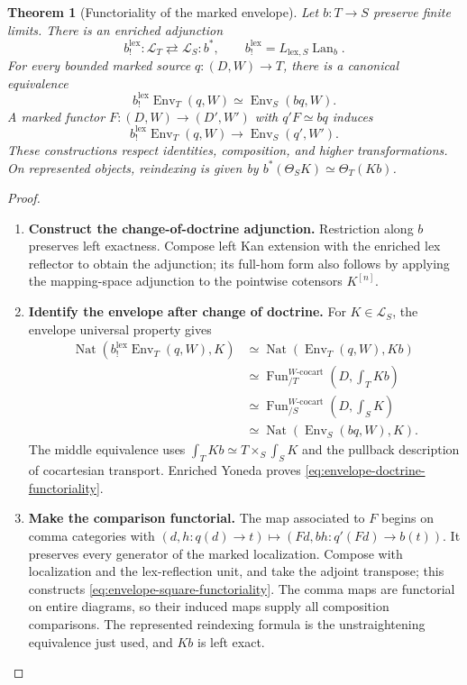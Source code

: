 \documentclass[oneside]{article}
\theoremstyle{plain}
\newtheorem{theorem}{Theorem}[section]
\theoremstyle{definition}
\theoremstyle{remark}
\newcommand{\Env}{\operatorname{Env}}
\newcommand{\Fun}{\operatorname{Fun}}
\newcommand{\Nat}{\operatorname{Nat}}
\newcommand{\coc}{\mathrm{cocart}}
\begin{document}
\begin{theorem}[Functoriality of the marked envelope]
\label{thz:thm:envelope-functoriality}
Let $b:T\to S$ preserve finite limits. There is an enriched adjunction
\[
 b_!^{\mathrm{lex}}:\mathcal L_T\rightleftarrows\mathcal L_S:b^*,
 \qquad b_!^{\mathrm{lex}}=L_{\mathrm{lex},S}\operatorname{Lan}_b.
\]
For every bounded marked source $q:(D,W)\to T$, there is a canonical
equivalence
\begin{equation}\label{eq:envelope-doctrine-functoriality}
 b_!^{\mathrm{lex}}\Env_T(q,W)\simeq\Env_S(bq,W).
\end{equation}
A marked functor $F:(D,W)\to(D',W')$ with $q'F\simeq bq$ induces
\begin{equation}\label{eq:envelope-square-functoriality}
 b_!^{\mathrm{lex}}\Env_T(q,W)\longrightarrow\Env_S(q',W').
\end{equation}
These constructions respect identities, composition, and higher
transformations. On represented objects, reindexing is given by
$b^*(\Theta_SK)\simeq\Theta_T(Kb)$.
\end{theorem}
\begin{proof}
\leavevmode
\begin{enumerate}
\item \textbf{Construct the change-of-doctrine adjunction.}
Restriction along $b$ preserves left exactness. Compose left Kan
extension with the enriched lex reflector to obtain the adjunction;
its full-hom form also follows by applying the mapping-space adjunction
to the pointwise cotensors $K^{[n]}$.

\item \textbf{Identify the envelope after change of doctrine.}
For $K\in\mathcal L_S$, the envelope universal property gives
\begin{align*}
 \Nat(b_!^{\mathrm{lex}}\Env_T(q,W),K)
 &\simeq\Nat(\Env_T(q,W),Kb)\\
 &\simeq\Fun^{W\text{-}\coc}_{/T}(D,\textstyle\int_TKb)\\
 &\simeq\Fun^{W\text{-}\coc}_{/S}(D,\textstyle\int_SK)\\
 &\simeq\Nat(\Env_S(bq,W),K).
\end{align*}
The middle equivalence uses
$\int_TKb\simeq T\times_S\int_SK$ and the pullback description of
cocartesian transport. Enriched Yoneda proves
\eqref{eq:envelope-doctrine-functoriality}.


\item \textbf{Make the comparison functorial.}
The map associated to $F$ begins on comma categories with
$(d,h:q(d)\to t)\mapsto(Fd,bh:q'(Fd)\to b(t))$.
It preserves every generator of the marked localization. Compose with
localization and the lex-reflection unit, and take the adjoint transpose;
this constructs \eqref{eq:envelope-square-functoriality}. The comma maps
are functorial on entire diagrams, so their induced maps supply all
composition comparisons. The represented reindexing formula is the
unstraightening equivalence just used, and $Kb$ is left exact.
\qedhere
\end{enumerate}
\end{proof}
\end{document}
